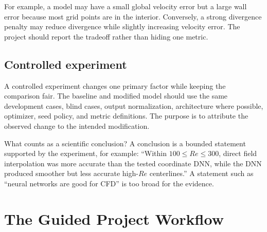 \documentclass[11pt]{article}
\newcommand{\variant}[1]{\textbf{#1}}
\begin{document}
For example, a model may have a small global velocity error but a large wall error because most grid points are in the interior. Conversely, a strong divergence penalty may reduce divergence while slightly increasing velocity error. The project should report the tradeoff rather than hiding one metric.

\subsection{Controlled experiment}
A controlled experiment changes one primary factor while keeping the comparison fair. The baseline and modified model should use the same development cases, blind cases, output normalization, architecture where possible, optimizer, seed policy, and metric definitions. The purpose is to attribute the observed change to the intended modification.

\begin{definitionbox}{What counts as a scientific conclusion?}
A conclusion is a bounded statement supported by the experiment, for example: ``Within $100\le Re\le300$, direct field interpolation was more accurate than the tested coordinate DNN, while the DNN produced smoother but less accurate high-$Re$ centerlines.'' A statement such as ``neural networks are good for CFD'' is too broad for the evidence.
\end{definitionbox}


\section{The Guided Project Workflow}
\begin{center}
\end{center}
\end{document}
